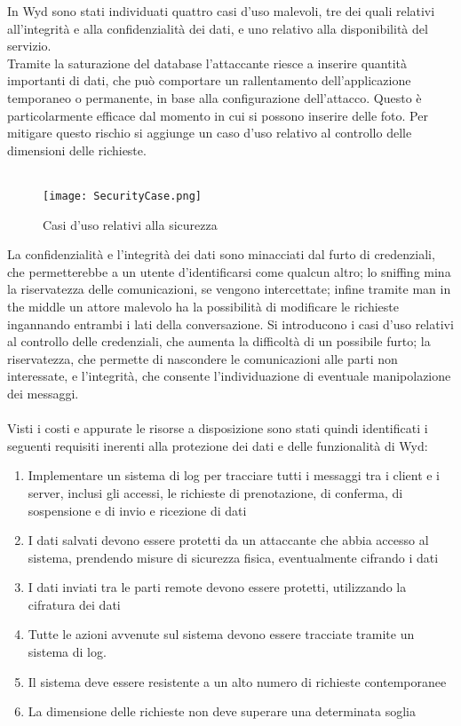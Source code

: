 In Wyd sono stati individuati quattro casi d'uso malevoli,
tre dei quali relativi all'integrità e alla confidenzialità dei dati,
e uno relativo alla disponibilità del servizio.\\
Tramite la saturazione del database l'attaccante
riesce a inserire quantità importanti di dati,
che può comportare un rallentamento dell'applicazione temporaneo o permanente,
in base alla configurazione dell'attacco.
Questo è particolarmente efficace dal momento in cui si possono inserire delle foto.
Per mitigare questo rischio si aggiunge un caso d'uso relativo al controllo delle dimensioni delle richieste.\\
\\
\begin{figure}[hb]
    \begin{center}
        \texttt{[image: SecurityCase.png]}
        \caption{Casi d'uso relativi alla sicurezza}
    \end{center}
\end{figure}
\clearpage

La confidenzialità e l'integrità dei dati sono minacciati dal furto di credenziali,
che permetterebbe a un utente d'identificarsi come qualcun altro;
lo sniffing mina la riservatezza delle comunicazioni, se vengono intercettate;
infine tramite man in the middle un attore malevolo ha la possibilità di modificare le richieste
ingannando entrambi i lati della conversazione.
Si introducono i casi d'uso relativi al controllo delle credenziali,
che aumenta la difficoltà di un possibile furto;
la riservatezza, che permette di nascondere le comunicazioni alle parti non interessate,
e l'integrità, che consente l'individuazione di eventuale manipolazione dei messaggi.\\
\\
Visti i costi e appurate le risorse a disposizione sono stati quindi identificati i seguenti requisiti
inerenti alla protezione dei dati e delle funzionalità di Wyd:

\begin{enumerate}
    \item Implementare un sistema di log per tracciare tutti i messaggi tra i client e i server, inclusi gli accessi, le richieste di prenotazione, di conferma, di sospensione e di invio e ricezione di dati
    \item I dati salvati devono essere protetti da un attaccante che abbia accesso al sistema, prendendo misure di sicurezza fisica, eventualmente cifrando i dati
    \item I dati inviati tra le parti remote devono essere protetti, utilizzando la cifratura dei dati
    \item Tutte le azioni avvenute sul sistema devono essere tracciate tramite un sistema di log.
    \item Il sistema deve essere resistente a un alto numero di richieste contemporanee
    \item La dimensione delle richieste non deve superare una determinata soglia
\end{enumerate}

